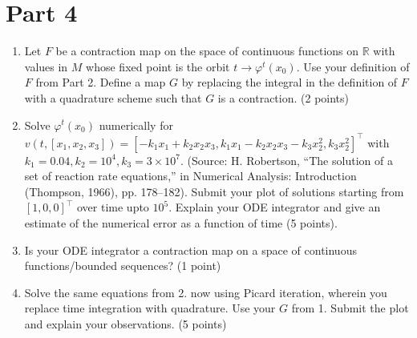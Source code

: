 \documentclass[12pt]{article}
\begin{document}
\section*{Part 4}
\begin{enumerate}
    \item Let $F$ be a contraction map on the space of continuous functions on $\mathbb{R}$ with values in $M$ whose fixed point is the orbit $t\to \varphi^t(x_0)$. Use your definition of $F$ from Part 2.
        Define a map $G$ by replacing the integral in the definition of $F$ with a quadrature scheme such that $G$ is a contraction. (2 points)
    \item Solve $\varphi^t(x_0)$ numerically for $v(t, [x_1, x_2, x_3]) = [-k_1 x_1 + k_2 x_2 x_3, k_1 x_1 - k_2 x_2 x_3 - k_3 x_2^2 , k_3 x_2^2]^\top$ with $k_1 = 0.04, k_2 = 10^4, k_3 = 3 \times 10^7.$ (Source: H. Robertson, “The solution of a set of reaction rate equations,” in Numerical
    Analysis: Introduction (Thompson, 1966), pp. 178–182). Submit your plot of solutions starting from $[1,0,0]^\top$ over time upto $10^5.$ Explain your ODE integrator and give an estimate of the numerical error as a function of time (5 points).
    \item Is your ODE integrator a contraction map on a space of continuous functions/bounded sequences? (1 point)
    \item Solve the same equations from 2. now using Picard iteration, wherein you replace time integration with quadrature. Use your $G$ from 1. 
        Submit the plot and explain your observations. (5 points)
\end{enumerate}
\end{document}
